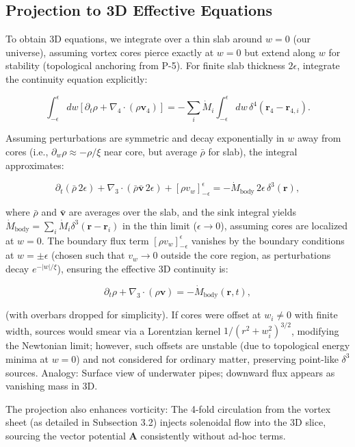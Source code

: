 \documentclass{article}
\begin{document}
\subsection{Projection to 3D Effective Equations}

To obtain 3D equations, we integrate over a thin slab around $w=0$ (our universe), assuming vortex cores pierce exactly at $w=0$ but extend along $w$ for stability (topological anchoring from P-5). For finite slab thickness $2\epsilon$, integrate the continuity equation explicitly:

\[
\int_{-\epsilon}^{\epsilon} dw \left[ \partial_t \rho + \nabla_4 \cdot (\rho \mathbf{v}_4) \right] = -\sum_i \dot{M}_i \int_{-\epsilon}^{\epsilon} dw \, \delta^4(\mathbf{r}_4 - \mathbf{r}_{4,i}).
\]

Assuming perturbations are symmetric and decay exponentially in $w$ away from cores (i.e., $\partial_w \rho \approx - \rho / \xi$ near core, but average $\bar{\rho}$ for slab), the integral approximates:

\[
\partial_t (\bar{\rho} \, 2\epsilon) + \nabla_3 \cdot (\bar{\rho} \bar{\mathbf{v}} \, 2\epsilon) + [\rho v_w]_{-\epsilon}^{\epsilon} = -\dot{M}_{\text{body}} \, 2\epsilon \, \delta^3(\mathbf{r}),
\]

where $\bar{\rho}$ and $\bar{\mathbf{v}}$ are averages over the slab, and the sink integral yields $\dot{M}_{\text{body}} = \sum_i \dot{M}_i \delta^3(\mathbf{r} - \mathbf{r}_i)$ in the thin limit ($\epsilon \to 0$), assuming cores are localized at $w=0$. The boundary flux term $[\rho v_w]_{-\epsilon}^{\epsilon}$ vanishes by the boundary conditions at $w = \pm \epsilon$ (chosen such that $v_w \to 0$ outside the core region, as perturbations decay $e^{-|w|/ \xi}$), ensuring the effective 3D continuity is:

\[
\partial_t \rho + \nabla_3 \cdot (\rho \mathbf{v}) = - \dot{M}_{\text{body}}(\mathbf{r}, t),
\]

(with overbars dropped for simplicity). If cores were offset at $w_i \neq 0$ with finite width, sources would smear via a Lorentzian kernel $1/(r^2 + w_i^2)^{3/2}$, modifying the Newtonian limit; however, such offsets are unstable (due to topological energy minima at $w=0$) and not considered for ordinary matter, preserving point-like $\delta^3$ sources. Analogy: Surface view of underwater pipes; downward flux appears as vanishing mass in 3D.

The projection also enhances vorticity: The 4-fold circulation from the vortex sheet (as detailed in Subsection 3.2) injects solenoidal flow into the 3D slice, sourcing the vector potential $\mathbf{A}$ consistently without ad-hoc terms.
\end{document}
